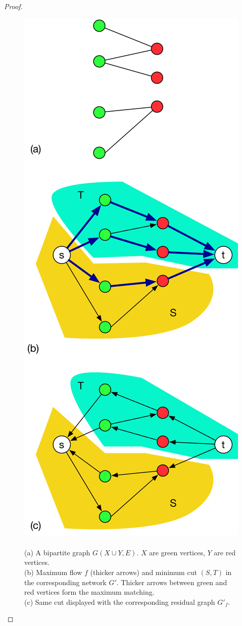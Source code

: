 \begin{proof}
\begin{figure}[t]
\includegraphics[scale=0.5]{koenig.pdf}
\caption{\\
             (a) A bipartite graph $G(X \cup Y, E)$. $X$ are green vertices, $Y$ are red vertices.\\
             (b) Maximum flow $f$ (thicker arrows) and minimum cut $(S, T)$ in the corresponding network $G'$. Thicker arrows between green and red vertices form the maximum matching.\\
             (c) Same cut displayed with the corresponding residual graph $G'_f$.}
	\label{koenig_example}
\end{figure}


\end{proof}
